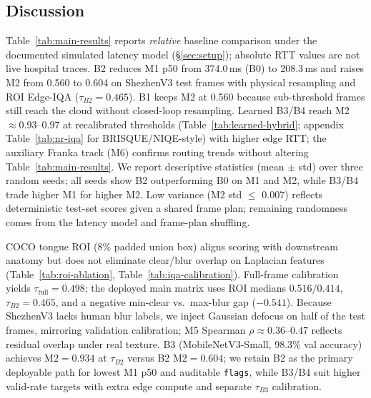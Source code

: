 \subsection{Discussion}
\label{sec:discussion}

Table~\ref{tab:main-results} reports \emph{relative} baseline comparison under the documented simulated latency model (\S\ref{sec:setup}); absolute RTT values are not live hospital traces.
B2 reduces M1 p50 from 374.0\,ms (B0) to 208.3\,ms and raises M2 from 0.560 to 0.604 on ShezhenV3 test frames with physical resampling and ROI Edge-IQA ($\tau_{B2}{=}0.465$).
B1 keeps M2 at 0.560 because sub-threshold frames still reach the cloud without closed-loop resampling.
Learned B3/B4 reach M2 $\approx 0.93$--$0.97$ at recalibrated thresholds (Table~\ref{tab:learned-hybrid}; appendix Table~\ref{tab:nr-iqa} for BRISQUE/NIQE-style) with higher edge RTT; the auxiliary Franka track (M6) confirms routing trends without altering Table~\ref{tab:main-results}.
We report descriptive statistics (mean $\pm$ std) over three random seeds; all seeds show B2 outperforming B0 on M1 and M2, while B3/B4 trade higher M1 for higher M2.
Low variance (M2 std $\leq$ 0.007) reflects deterministic test-set scores given a shared frame plan; remaining randomness comes from the latency model and frame-plan shuffling.

COCO tongue ROI (8\% padded union box) aligns scoring with downstream anatomy but does not eliminate clear/blur overlap on Laplacian features (Table~\ref{tab:roi-ablation}, Table~\ref{tab:iqa-calibration}).
Full-frame calibration yields $\tau_{\mathrm{full}}{=}0.498$; the deployed main matrix uses ROI medians $0.516/0.414$, $\tau_{B2}{=}0.465$, and a negative min-clear vs.\ max-blur gap ($-0.541$).
Because ShezhenV3 lacks human blur labels, we inject Gaussian defocus on half of the test frames, mirroring validation calibration; M5 Spearman $\rho{\approx}0.36$--$0.47$ reflects residual overlap under real texture.
B3 (MobileNetV3-Small, 98.3\% val accuracy) achieves M2$=0.934$ at $\tau_{B2}$ versus B2 M2$=0.604$; we retain B2 as the primary deployable path for lowest M1 p50 and auditable \texttt{flags}, while B3/B4 suit higher valid-rate targets with extra edge compute and separate $\tau_{B3}$ calibration.


